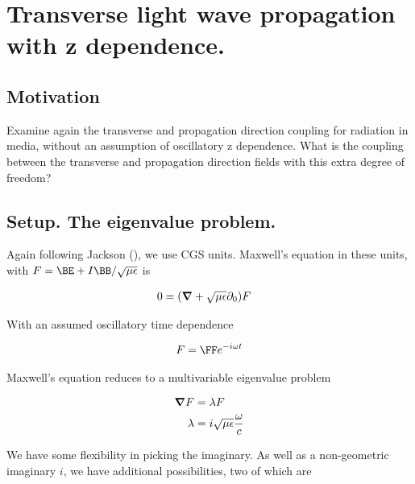 

\chapter{Transverse light wave propagation with z dependence.}
\label{chap:maxwellHomoFirstOrder}
{}
\date{Aug 9, 2009}

\beginArtWithToc

\section{Motivation}

Examine again the transverse and propagation direction coupling for radiation in media, without an assumption of oscillatory z dependence.  What is the coupling between the transverse and propagation direction fields with this extra degree of freedom?

\section{Setup.  The eigenvalue problem.}

Again following Jackson (\cite{jackson1975cew}), we use CGS units.  Maxwell's equation in these units, with $F = \BE + I\BB/\sqrt{\mu\epsilon}$ is

\begin{align}\label{eqn:foo1}
0 &= (\boldsymbol{\nabla} + \sqrt{\mu\epsilon} \partial_0) F 
\end{align}

With an assumed oscillatory time dependence 

\begin{align}\label{eqn:foo2}
F = \FF e^{-i\omega t}
\end{align}

Maxwell's equation reduces to a multivariable eigenvalue problem

\begin{align}\label{eqn:foo3}
\boldsymbol{\nabla} F &= \lambda F \\
\lambda &= i\sqrt{\mu\epsilon} \frac{\omega}{c} 
\end{align}

We have some flexibility in picking the imaginary.  As well as a non-geometric imaginary $i$, we have additional possibilities, two of which are

